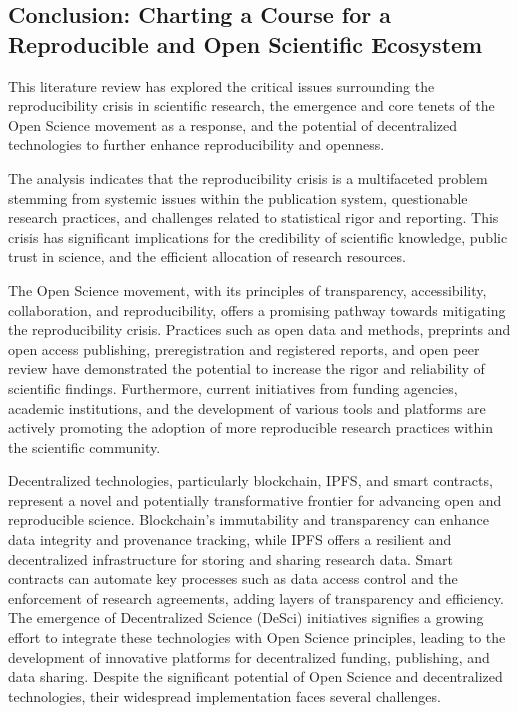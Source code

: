 \documentclass{article}
\begin{document}
\subsection{Conclusion: Charting a Course for a Reproducible and Open Scientific Ecosystem}

This literature review has explored the critical issues surrounding the reproducibility crisis in scientific research, the emergence and core tenets of the Open Science movement as a response, and the potential of decentralized technologies to further enhance reproducibility and openness.

The analysis indicates that the reproducibility crisis is a multifaceted problem stemming from systemic issues within the publication system, questionable research practices, and challenges related to statistical rigor and reporting. This crisis has significant implications for the credibility of scientific knowledge, public trust in science, and the efficient allocation of research resources.

The Open Science movement, with its principles of transparency, accessibility, collaboration, and reproducibility, offers a promising pathway towards mitigating the reproducibility crisis. Practices such as open data and methods, preprints and open access publishing, preregistration and registered reports, and open peer review have demonstrated the potential to increase the rigor and reliability of scientific findings. Furthermore, current initiatives from funding agencies, academic institutions, and the development of various tools and platforms are actively promoting the adoption of more reproducible research practices within the scientific community.

Decentralized technologies, particularly blockchain, IPFS, and smart contracts, represent a novel and potentially transformative frontier for advancing open and reproducible science. Blockchain's immutability and transparency can enhance data integrity and provenance tracking, while IPFS offers a resilient and decentralized infrastructure for storing and sharing research data. Smart contracts can automate key processes such as data access control and the enforcement of research agreements, adding layers of transparency and efficiency. The emergence of Decentralized Science (DeSci) initiatives signifies a growing effort to integrate these technologies with Open Science principles, leading to the development of innovative platforms for decentralized funding, publishing, and data sharing. Despite the significant potential of Open Science and decentralized technologies, their widespread implementation faces several challenges.
\end{document}
